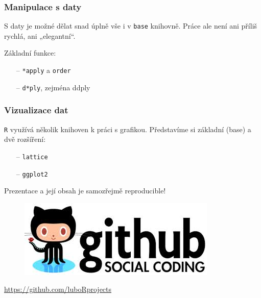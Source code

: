 \documentclass[10pt,xcolor={dvipsnames}]{beamer}
\begin{document}
\begin{frame}
\frametitle{Manipulace s daty}
\begin{large}
S daty je možné dělat snad úplně vše i v \texttt{base} knihovně. Práce ale není ani příliš rychlá, ani „elegantní“. \newline\smallskip

Základní funkce:\smallskip
\begin{itemize}
\item[--] \texttt{*apply} a \texttt{order}
\item[--] \texttt{d*ply}, zejména ddply
\end{itemize}
\end{large}
\end{frame}

\begin{frame}
\frametitle{Vizualizace dat}
\begin{large}
\texttt{R} využívá několik knihoven k práci s grafikou. Představíme si základní (base) a dvě rozšíření:
\begin{itemize}
\item[--] \texttt{lattice}
\item[--] \texttt{ggplot2}
\end{itemize}
\end{large}
\end{frame}


\begin{frame}
Prezentace a její obsah je samozřejmě reproducible!
\begin{figure}
\centering
\includegraphics[scale=0.7]{github_logo}
\end{figure}
\url{https://github.com/luboRprojects}
\end{frame}
\end{document}
